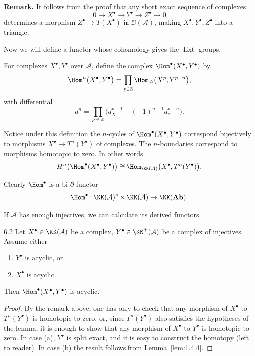 \textbf{Remark.}
It follows from the proof that any short exact sequence of complexes
\[
0 \to X^\bullet \to Y^\bullet \to Z^\bullet \to 0
\]
determines a morphism $Z^\bullet\to T(X^\bullet)$ in $\DD(\mathcal{A})$, making $X^\bullet,Y^\bullet,Z^\bullet$
into a triangle.

Now we will define a functor whose cohomology gives the  $\operatorname{Ext}$ groups.

\begin{definition*}
For complexes $X^\bullet,Y^\bullet$ over $\mathcal{A}$, define the complex
$\Hom^\bullet(X^\bullet,Y^\bullet)$ by
\[
\Hom^n\big(X^\bullet,Y^\bullet\big)
= \prod_{p\in\mathbb{Z}} \Hom_{\mathcal{A}}\big(X^p,Y^{p+n}\big),
\]
with differential
\[
d^n = \prod_{p\in\mathbb{Z}} \big(d_X^{p-1} + (-1)^{n+1}d_Y^{p+n}\big).
\]

Notice under this definition the $n$-cycles of $\Hom^\bullet(X^\bullet,Y^\bullet)$ correspond bijectively
to morphisms $X^\bullet\to T^n(Y^\bullet)$ of complexes.
The $n$-boundaries correspond to morphisms homotopic to zero.
In other words
\[
H^n\big(\Hom^\bullet(X^\bullet,Y^\bullet)\big)
\cong \Hom_{\KK(\mathcal{A})}\big(X^\bullet, T^n(Y^\bullet)\big).
\]

Clearly $\Hom^\bullet$ is a bi-$\partial$-functor
\[
\Hom^\bullet\colon\KK(\mathcal{A})^\circ \times \KK(\mathcal{A}) \to \KK(\mathbf{Ab}).
\]
\end{definition*}

If $\mathcal{A}$ has enough injectives, we can calculate its derived   functors.

\begin{booklemma}{6.2}\label{lem:1.6.2}
Let $X^\bullet\in\KK(\mathcal{A})$ be a complex, $Y^\bullet\in\KK^+(\mathcal{A})$ be a complex of injectives.
Assume either
\begin{enumerate}
\item[(a)] $Y^\bullet$ is acyclic, or
\item[(b)] $X^\bullet$ is acyclic.
\end{enumerate}
Then $\Hom^\bullet(X^\bullet,Y^\bullet)$ is acyclic.
\end{booklemma}

\begin{proof}
By the remark above, one has only to check that any morphism of $X^\bullet$ to $T^n(Y^\bullet)$ is homotopic to zero, or, since $T^n(Y^\bullet)$ also satisfies the hypotheses of the lemma, it is enough to show that any morphism of $X^\bullet$ to $Y^\bullet$ is homotopic to zero.
In case (a), $Y^\bullet$ is split exact, and it is easy to construct the homotopy (left to reader).
In case (b) the result follows from Lemma~\ref{lem:1.4.4}.
\end{proof}

